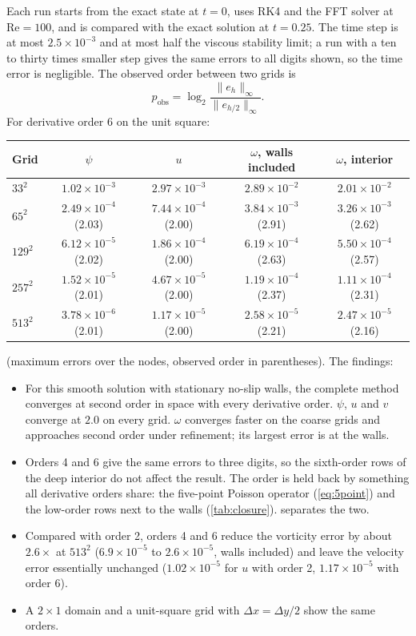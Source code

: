 \documentclass[11pt,a4paper]{article}
\newcommand{\Rey}{\mathrm{Re}}
\newcommand{\dx}{\Delta x}
\newcommand{\dy}{\Delta y}
\begin{document}
Each run starts from the exact state at $t=0$, uses RK4 and the FFT solver at $\Rey=100$, and is compared with the exact solution at $t=0.25$.  The time step is at most $2.5\times10^{-3}$ and at most half the viscous stability limit; a run with a ten to thirty times smaller step gives the same errors to all digits shown, so the time error is negligible.  The observed order between two grids is
\begin{equation}
p_{\mathrm{obs}}=\log_2\frac{\|e_h\|_\infty}{\|e_{h/2}\|_\infty}.
\end{equation}
For derivative order 6 on the unit square:
\begin{center}
\begin{tabular}{lcccc}
\toprule
Grid & $\psi$ & $u$ & $\omega$, walls included & $\omega$, interior \\
\midrule
$33^2$ & $1.02\times10^{-3}$ & $2.97\times10^{-3}$ & $2.89\times10^{-2}$ & $2.01\times10^{-2}$ \\
$65^2$ & $2.49\times10^{-4}$ (2.03) & $7.44\times10^{-4}$ (2.00) & $3.84\times10^{-3}$ (2.91) & $3.26\times10^{-3}$ (2.62) \\
$129^2$ & $6.12\times10^{-5}$ (2.02) & $1.86\times10^{-4}$ (2.00) & $6.19\times10^{-4}$ (2.63) & $5.50\times10^{-4}$ (2.57) \\
$257^2$ & $1.52\times10^{-5}$ (2.01) & $4.67\times10^{-5}$ (2.00) & $1.19\times10^{-4}$ (2.37) & $1.11\times10^{-4}$ (2.31) \\
$513^2$ & $3.78\times10^{-6}$ (2.01) & $1.17\times10^{-5}$ (2.00) & $2.58\times10^{-5}$ (2.21) & $2.47\times10^{-5}$ (2.16) \\
\bottomrule
\end{tabular}
\end{center}
(maximum errors over the nodes, observed order in parentheses).  The findings:
\begin{itemize}[leftmargin=2em]
  \item For this smooth solution with stationary no-slip walls, the complete method converges at second order in space with every derivative order.  $\psi$, $u$ and $v$ converge at $2.0$ on every grid.  $\omega$ converges faster on the coarse grids and approaches second order under refinement; its largest error is at the walls.
  \item Orders 4 and 6 give the same errors to three digits, so the sixth-order rows of the deep interior do not affect the result.  The order is held back by something all derivative orders share: the five-point Poisson operator (\cref{eq:5point}) and the low-order rows next to the walls (\cref{tab:closure}).   separates the two.
  \item Compared with order 2, orders 4 and 6 reduce the vorticity error by about $2.6\times$ at $513^2$ ($6.9\times10^{-5}$ to $2.6\times10^{-5}$, walls included) and leave the velocity error essentially unchanged ($1.02\times10^{-5}$ for $u$ with order 2, $1.17\times10^{-5}$ with order 6).
  \item A $2\times1$ domain and a unit-square grid with $\dx=\dy/2$ show the same orders.
\end{itemize}
\end{document}
